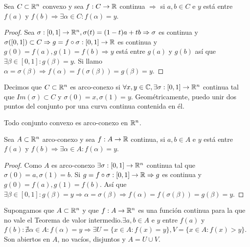 \begin{prop}
  Sea \(C \subset \mathbb{R}^n\) convexo y sea \(f : C \to \mathbb{R} \) continua \(\Rightarrow \) si \(a, b \in C\) e \(y\) está entre \(f(a)\) y \(f(b) \Rightarrow \exists \alpha \in C : f(\alpha) = y\).
  \begin{proof}
    Sea \(\sigma: [0, 1] \to \mathbb{R}^n, \sigma(t) = (1-t)a+tb \Rightarrow \sigma \) es continua y \(\sigma([0, 1]) \subset C \Rightarrow g = f \circ \sigma: [0, 1] \to \mathbb{R} \) es continua y \(g(0) = f(a), g(1) = f(b) \Rightarrow y\) está entre \(g(a)\) y \(g(b)\) así que \(\exists \beta \in [0, 1] : g(\beta) = y\). Si llamo \(\alpha = \sigma(\beta) \Rightarrow f(\alpha) = f(\sigma(\beta)) = g(\beta) = y\).
  \end{proof}
\end{prop}

\begin{definition}
  Decimos que \(C \subset \mathbb{R}^n\) es arco-conexo si \(\forall x, y \in \mathbb{C}, \exists \sigma: [0, 1] \to \mathbb{R}^n\) continua tal que \(Im(\sigma) \subset C\) y \(\sigma(0) = x, \sigma(1) = y\). Geométricamente, puedo unir dos puntos del conjunto por una curva continua contenida en él.
\end{definition}

\begin{note}
  Todo conjunto convexo es arco-conexo en \(\mathbb{R}^n\).
\end{note}

\begin{prop}
  Sea \(A \subset \mathbb{R}^n\) arco-conexo y sea \(f: A \to \mathbb{R} \) continua, si \(a, b \in A\) e \(y\) está entre \(f(a)\) y \(f(b) \Rightarrow \exists \alpha \in A : f(\alpha) = y\).
  \begin{proof}
    Como \(A\) es arco-conexo \(\exists \sigma: [0, 1] \to \mathbb{R}^n\) continua tal que \(\sigma(0) = a, \sigma(1) = b\). Si \(g = f \circ \sigma: [0, 1] \to \mathbb{R} \Rightarrow g\) es continua y \(g(0) = f(a), g(1) = f(b)\). Así que \(\exists \beta \in [0, 1] : g(\beta) = y \Rightarrow \alpha = \sigma(\beta) \Rightarrow f(\alpha) = f(\sigma(\beta)) = g(\beta) = y\).
  \end{proof}
\end{prop}

\begin{note}
  Supongamos que \(A \subset \mathbb{R}^n\) y que \(f: A \to \mathbb{R}^n\) es una función continua para la que no vale el Teorema de valor intermedio.\(\exists a, b \in A\) e \(y\) entre \(f(a)\) y \(f(b) : \nexists \alpha \in A : f(\alpha) = y \Rightarrow \exists U = \{ x \in A : f(x) = y \}, V = \{ x \in A : f(x) > y \} \). Son abiertos en \(A\), no vacíos, disjuntos y \(A = U \cup V\).
\end{note}

